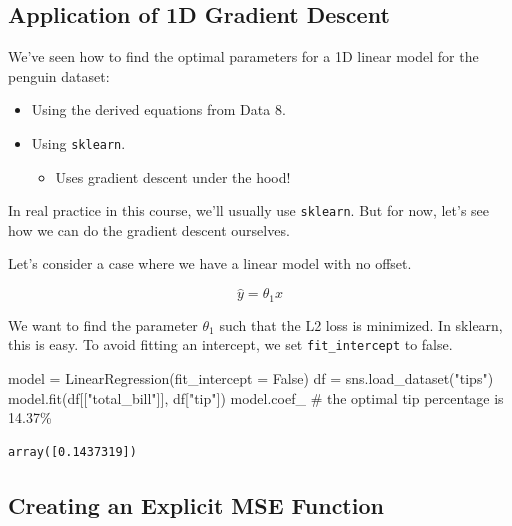 \documentclass[
  letterpaper,
  DIV=11,
  numbers=noendperiod]{scrreprt}
\newenvironment{Shaded}{\begin{snugshade}}{\end{snugshade}}
\newcommand{\CommentTok}[1]{\textcolor[rgb]{0.37,0.37,0.37}{#1}}
\newcommand{\NormalTok}[1]{\textcolor[rgb]{0.00,0.23,0.31}{#1}}
\newcommand{\OperatorTok}[1]{\textcolor[rgb]{0.37,0.37,0.37}{#1}}
\newcommand{\StringTok}[1]{\textcolor[rgb]{0.13,0.47,0.30}{#1}}
\newcommand{\VariableTok}[1]{\textcolor[rgb]{0.07,0.07,0.07}{#1}}
\providecommand{\tightlist}{%
  \setlength{\itemsep}{0pt}\setlength{\parskip}{0pt}}\usepackage{longtable,booktabs,array}
\begin{document}
\hypertarget{application-of-1d-gradient-descent}{%
\subsection{Application of 1D Gradient
Descent}\label{application-of-1d-gradient-descent}}

We've seen how to find the optimal parameters for a 1D linear model for
the penguin dataset:

\begin{itemize}
\tightlist
\item
  Using the derived equations from Data 8.
\item
  Using \texttt{sklearn}.

  \begin{itemize}
  \tightlist
  \item
    Uses gradient descent under the hood!
  \end{itemize}
\end{itemize}

In real practice in this course, we'll usually use \texttt{sklearn}. But
for now, let's see how we can do the gradient descent ourselves.

Let's consider a case where we have a linear model with no offset.

\[\hat{y} = \theta_1 x\]

We want to find the parameter \(\theta_1\) such that the L2 loss is
minimized. In sklearn, this is easy. To avoid fitting an intercept, we
set \texttt{fit\_intercept} to false.

\begin{Shaded}
\begin{Highlighting}[]
\NormalTok{model }\OperatorTok{=}\NormalTok{ LinearRegression(fit\_intercept }\OperatorTok{=} \VariableTok{False}\NormalTok{)}
\NormalTok{df }\OperatorTok{=}\NormalTok{ sns.load\_dataset(}\StringTok{"tips"}\NormalTok{)}
\NormalTok{model.fit(df[[}\StringTok{"total\_bill"}\NormalTok{]], df[}\StringTok{"tip"}\NormalTok{])}
\NormalTok{model.coef\_ }\CommentTok{\# the optimal tip percentage is 14.37\%}
\end{Highlighting}
\end{Shaded}

\begin{verbatim}
array([0.1437319])
\end{verbatim}

\hypertarget{creating-an-explicit-mse-function}{%
\subsection{Creating an Explicit MSE
Function}\label{creating-an-explicit-mse-function}}
\end{document}

